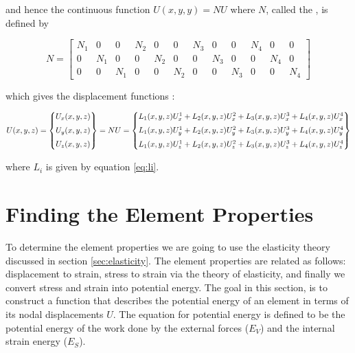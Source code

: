 and hence the continuous function $U(x,y,y) = N U$ where $N$, called the
, is defined by

\begin{equation}
\label{eq:interpolation_matrix}
N = \left[
\begin{array}{cccccccccccc}
N_1 & 0 & 0 & N_2 & 0 & 0 & N_3 & 0 & 0 & N_4 & 0 & 0 \\
0 & N_1 & 0 & 0 & N_2 & 0 & 0 & N_3 & 0 & 0 & N_4 & 0 \\
0 & 0 & N_1 & 0 & 0 & N_2 & 0 & 0 & N_3 & 0 & 0 & N_4
\end{array}
\right]
\end{equation}

which gives the displacement functions
:

\begin{equation}
U(x,y,z) =
\begin{Bmatrix}
U_x(x,y,z) 
\vspace{2mm} \\
U_y(x,y,z) 
\vspace{2mm} \\
U_z(x,y,z)
\end{Bmatrix}
= N U =
\begin{Bmatrix}
  L_1(x,y,z) U_x^{1} + L_2(x,y,z) U_x^{2}
  + L_3(x,y,z) U_x^{3} + L_4(x,y,z) U_x^{4}
\vspace{2mm}\\
  L_1(x,y,z) U_y^{1} + L_2(x,y,z) U_y^{2}
  + L_3(x,y,z) U_y^{3} + L_4(x,y,z) U_y^{4} 
\vspace{2mm}\\
  L_1(x,y,z) U_z^{1} + L_2(x,y,z) U_z^{2} 
  + L_3(x,y,z) U_z^{3} + L_4(x,y,z) U_z^{4}
\end{Bmatrix}
\end{equation}

where $L_i$ is given by equation \eqref{eq:li}.

\section{Finding the Element Properties}
%
To determine the element properties we are going to use the elasticity
theory discussed in section \vref{sec:elasticity}. The element
properties are related as follows:
displacement to strain, stress to strain via the theory of
elasticity, and finally we convert stress and strain into potential
energy. The goal in this section, is to construct a function
that describes the potential energy of an element in terms of its nodal
displacements $U$. The equation for potential energy is defined
to be the potential energy of the work done by the external forces
($E_V$) and the internal strain energy ($E_S$).

